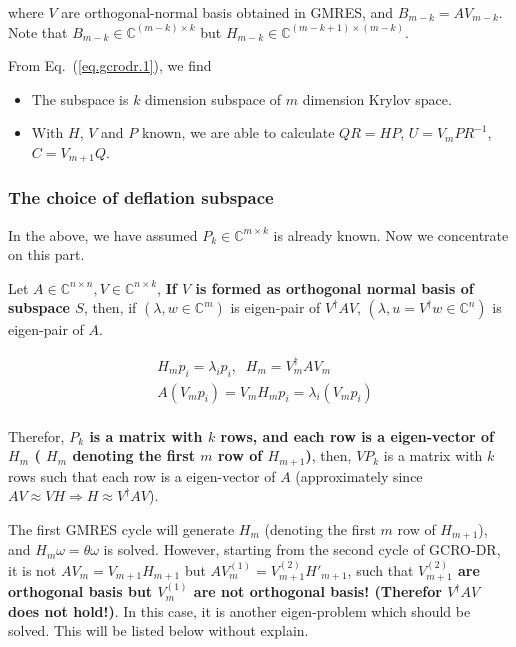 where $V$ are orthogonal-normal basis obtained in GMRES, and $B_{m-k}=AV_{m-k}$. Note that \textcolor[rgb]{0,0,1}{$B_{m-k}\in \mathbb{C}^{(m-k)\times k}$ but $H_{m-k}\in \mathbb{C}^{(m-k+1)\times (m-k)}$}.

From Eq.~(\ref{eq.gcrodr.1}), we find

\begin{itemize}
  \item The subspace is $k$ dimension subspace of $m$ dimension Krylov space.
  \item With $H$, $V$ and $P$ known, we are able to calculate $QR=HP$, $U=V_mPR^{-1}$, $C=V_{m+1}Q$.
\end{itemize}

\subsubsection{\label{sec:deflationsubspace}The choice of deflation subspace}

In the above, we have assumed $P_k\in \mathbb{C}^{m\times k}$ is already known. Now we concentrate on this part.

Let $A\in \mathbb{C}^{n\times n},V\in \mathbb{C}^{n\times k}$, \textbf{If $V$ is formed as orthogonal normal basis of subspace $S$}, then, if $(\lambda, w\in \mathbb{C}^m)$ is eigen-pair of $V^{\dagger}AV$, $(\lambda, u=V^{\dagger}w\in \mathbb{C}^n)$ is eigen-pair of $A$.

\begin{equation}
\begin{split}
&H_mp_i=\lambda _i p_i,\;\;H_m=V_m^{\dagger}AV_m\\
&A\left(V_mp_i\right)=V_mH_mp_i=\lambda _i \left(V_mp_i\right)\\
\end{split}
\label{eq.gcrodr.subdeflation}
\end{equation}

Therefor, \textcolor[rgb]{0,0,1}{\textbf{$P_k$ is a matrix with $k$ rows, and each row is a eigen-vector of $H_m$ ( $H_m$ denoting the first $m$ row of $H_{m+1}$)}}, then, $VP_k$ is a matrix with $k$ rows such that each row is a eigen-vector of $A$ (approximately since $AV\approx VH \Rightarrow H \approx V^{\dagger}AV$).

The first GMRES cycle will generate $H_m$ (denoting the first $m$ row of $H_{m+1}$), and $H_m\omega=\theta \omega$ is solved. However, starting from the second cycle of GCRO-DR, it is not $AV_m=V_{m+1}H_{m+1}$ but $AV_m^{(1)}=V_{m+1}^{(2)}H'_{m+1}$, such that \textcolor[rgb]{1,0,0}{\textbf{$V_{m+1}^{(2)}$ are orthogonal basis but $V_{m}^{(1)}$ are not orthogonal basis! (Therefor $V^{\dagger}AV$ does not hold!)}}. In this case, it is another eigen-problem which should be solved. This will be listed below without explain.

